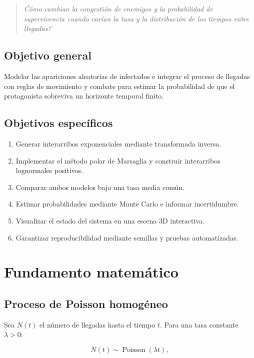 \documentclass[12pt,a4paper]{article}
\begin{document}
\begin{quote}
\textit{\'C\'omo cambian la congesti\'on de enemigos y la probabilidad de
supervivencia cuando var\'ian la tasa y la distribuci\'on de los tiempos entre
llegadas?}
\end{quote}

\subsection{Objetivo general}

Modelar las apariciones aleatorias de infectados e integrar el proceso de
llegadas con reglas de movimiento y combate para estimar la probabilidad de que
el protagonista sobreviva un horizonte temporal finito.

\subsection{Objetivos espec\'ificos}

\begin{enumerate}
  \item Generar interarribos exponenciales mediante transformada inversa.
  \item Implementar el m\'etodo polar de Marsaglia y construir interarribos
        lognormales positivos.
  \item Comparar ambos modelos bajo una tasa media com\'un.
  \item Estimar probabilidades mediante Monte Carlo e informar incertidumbre.
  \item Visualizar el estado del sistema en una escena 3D interactiva.
  \item Garantizar reproducibilidad mediante semillas y pruebas automatizadas.
\end{enumerate}

\section{Fundamento matem\'atico}

\subsection{Proceso de Poisson homog\'eneo}

Sea $N(t)$ el n\'umero de llegadas hasta el tiempo $t$. Para una tasa constante
$\lambda>0$:

\begin{equation}
N(t)\sim\operatorname{Poisson}(\lambda t),
\end{equation}
\end{document}

